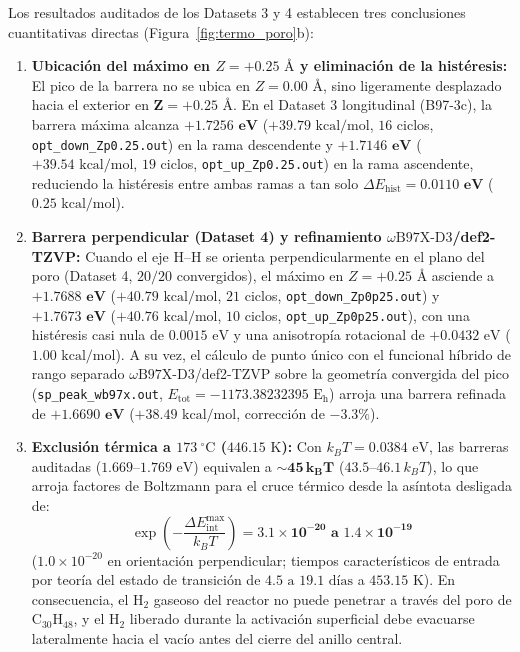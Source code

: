 \documentclass[10pt,twocolumn,a4paper]{article}
\begin{document}
Los resultados auditados de los Datasets 3 y 4 establecen tres conclusiones cuantitativas directas (Figura~\ref{fig:termo_poro}b):
\begin{enumerate}
    \item \textbf{Ubicación del máximo en $Z = +0.25\text{ \AA}$ y eliminación de la histéresis:} El pico de la barrera no se ubica en $Z = 0.00\text{ \AA}$, sino ligeramente desplazado hacia el exterior en $\mathbf{Z = +0.25\text{ \AA}}$. En el Dataset 3 longitudinal (B97-3c), la barrera máxima alcanza $\mathbf{+1.7256\text{ eV}}$ ($+39.79\text{ kcal/mol}$, $16$ ciclos, \texttt{opt\_down\_Zp0.25.out}) en la rama descendente y $\mathbf{+1.7146\text{ eV}}$ ($+39.54\text{ kcal/mol}$, $19$ ciclos, \texttt{opt\_up\_Zp0.25.out}) en la rama ascendente, reduciendo la histéresis entre ambas ramas a tan solo $\Delta E_{\text{hist}} = \mathbf{0.0110\text{ eV}}$ ($0.25\text{ kcal/mol}$).
    \item \textbf{Barrera perpendicular (Dataset 4) y refinamiento $\omega\text{B97X-D3}$/def2-TZVP:} Cuando el eje $\text{H--H}$ se orienta perpendicularmente en el plano del poro (Dataset 4, $20/20$ convergidos), el máximo en $Z = +0.25\text{ \AA}$ asciende a $\mathbf{+1.7688\text{ eV}}$ ($+40.79\text{ kcal/mol}$, $21$ ciclos, \texttt{opt\_down\_Zp0p25.out}) y $\mathbf{+1.7673\text{ eV}}$ ($+40.76\text{ kcal/mol}$, $10$ ciclos, \texttt{opt\_up\_Zp0p25.out}), con una histéresis casi nula de $0.0015\text{ eV}$ y una anisotropía rotacional de $+0.0432\text{ eV}$ ($1.00\text{ kcal/mol}$). A su vez, el cálculo de punto único con el funcional híbrido de rango separado $\omega\text{B97X-D3}$/def2-TZVP sobre la geometría convergida del pico (\texttt{sp\_peak\_wb97x.out}, $E_{\text{tot}} = -1173.38232395\text{ E}_\text{h}$) arroja una barrera refinada de $\mathbf{+1.6690\text{ eV}}$ ($+38.49\text{ kcal/mol}$, corrección de $-3.3\%$).
    \item \textbf{Exclusión térmica a $173\ ^\circ\text{C}$ ($446.15\text{ K}$):} Con $k_B T = 0.0384\text{ eV}$, las barreras auditadas ($1.669\text{--}1.769\text{ eV}$) equivalen a $\mathbf{\sim 45\,k_B T}$ ($43.5\text{--}46.1\,k_B T$), lo que arroja factores de Boltzmann para el cruce térmico desde la asíntota desligada de:
    \begin{equation}
    \exp\!\left(-\frac{\Delta E_{\text{int}}^{\max}}{k_B T}\right) = \mathbf{3.1 \times 10^{-20}\text{ a }1.4 \times 10^{-19}}
    \end{equation}
    ($1.0 \times 10^{-20}$ en orientación perpendicular; tiempos característicos de entrada por teoría del estado de transición de $4.5\text{ a }19.1\text{ días}$ a $453.15\text{ K}$). En consecuencia, el $\text{H}_2$ gaseoso del reactor no puede penetrar a través del poro de $\text{C}_{30}\text{H}_{48}$, y el $\text{H}_2$ liberado durante la activación superficial debe evacuarse lateralmente hacia el vacío antes del cierre del anillo central.
\end{enumerate}
\end{document}
